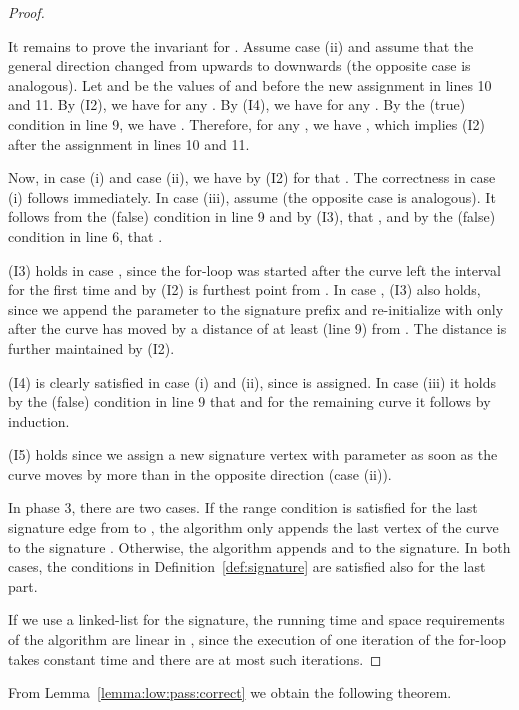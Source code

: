 \documentclass[11pt, letter]{article}
\newcommand{\lemref}[1]{Lemma~\ref{lemma:#1}}
\newcommand{\defref}[1]{Definition~\ref{def:#1}}
\begin{document}
\begin{proof}
\begin{compactitem}
It remains to prove the invariant for .
Assume case (ii) and assume that the general direction changed from
upwards to downwards (the opposite case is analogous). 
Let  and  be the values of  and  before the
new assignment in lines 10 and 11. By (I2),
we have  for any . By (I4), we
have  for any .
By the (true) condition in line 9, we have .
Therefore, for any , we have
, which implies (I2) after the assignment
in lines 10 and 11.

Now, in case (i) and case (ii), we have by (I2)  for  
that . The correctness in case (i)
follows immediately. In case (iii), assume  (the opposite
case is analogous). 
It follows from the (false) condition in line 9 and by (I3), that
, and by the (false)
condition in line 6, that . 

\item (I3) holds in case , since the for-loop was 
started after the curve  left the interval 
for the first time and by (I2)  is furthest
point from . In case , (I3) also holds, since we append the
parameter  to the signature prefix and re-initialize  with  only
after the curve has moved by a distance of at least  (line 9) from
. The distance is further maintained by (I2).

\item (I4) is clearly satisfied in case (i) and (ii), since  is assigned.
In case (iii) it holds by the (false) condition in line 9 that
 and for the remaining curve  it follows by induction.

\item (I5) holds since we assign a new signature vertex with parameter 
as soon as the curve moves by more than  in the opposite direction (case (ii)).  
\end{compactitem}

In phase 3, there are two cases. If the range condition is satisfied for the
last signature edge from  to , the algorithm only appends
the last vertex  of the curve  to the signature .
Otherwise, the algorithm appends  and  to the signature.  In
both cases, the conditions in \defref{signature} are satisfied also for the last
part. 

If we use a linked-list for the signature, the running time and space
requirements of the algorithm are linear in , since the execution of one
iteration of the for-loop takes constant time and there are at most  such
iterations.
\end{proof}

From \lemref{low:pass:correct} we obtain the following theorem.
\end{document}
